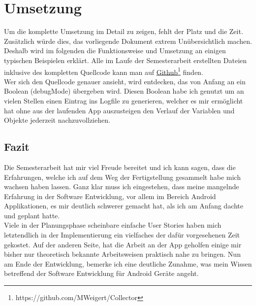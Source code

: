 \chapter{Umsetzung}
\label{ch:Umsetzung}

Um die komplette Umsetzung im Detail zu zeigen, fehlt der Platz und die Zeit. Zusätzlich würde dies, das vorliegende Dokument extrem Unübersichtlich machen. Deshalb wird im folgenden die Funktionsweise und Umsetzung an einigen typischen Beispielen erklärt. Alle im Laufe der Semesterarbeit erstellten Dateien inklusive des kompletten Quellcode kann man auf \href{https://github.com/MWeigert/Collector}{Github}\footnote{https://github.com/MWeigert/Collector} finden.\\

Wer sich den Quellcode genauer ansieht, wird entdecken, das von Anfang an ein Boolean (debugMode) übergeben wird. Diesen Boolean habe ich genutzt um an vielen Stellen einen Eintrag ins Logfile zu generieren, welcher es mir ermöglicht hat ohne aus der laufenden App auszusteigen den Verlauf der Variablen und Objekte jederzeit nachzuvollziehen.







\section{Fazit}

Die Semesterarbeit hat mir viel Freude bereitet und ich kann sagen, dass die Erfahrungen, welche ich auf dem Weg der Fertigstellung gesammelt habe mich wachsen haben lassen. Ganz klar muss ich eingestehen, dass meine mangelnde Erfahrung in der Software Entwicklung, vor allem im Bereich Android Applikationen, es mir deutlich schwerer gemacht hat, als ich am Anfang dachte und geplant hatte.\\

Viele in der Planungsphase scheinbare einfache User Stories haben mich letztendlich in der Implementierung ein vielfaches der dafür vorgesehenen Zeit gekostet. Auf der anderen Seite, hat die Arbeit an der App geholfen einige mir bisher nur theoretisch bekannte Arbeitsweisen praktisch nahe zu bringen. Nun am Ende der Entwicklung, bemerke ich eine deutliche Zunahme, was mein Wissen betreffend der Software Entwicklung für Android Geräte angeht.\\

